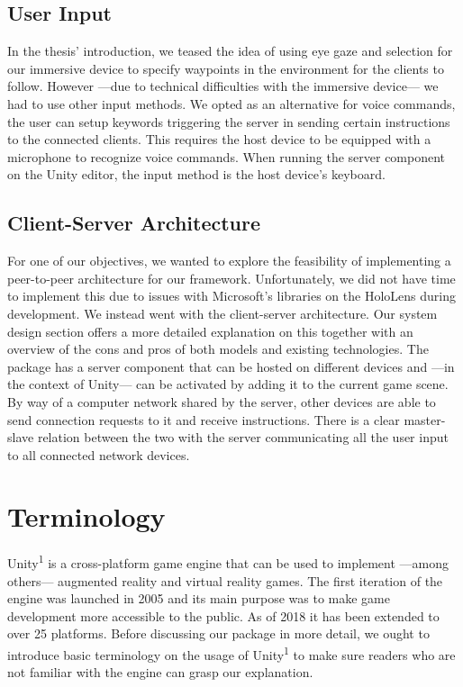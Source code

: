 \subsection{User Input}
In the thesis' introduction, we teased the idea of using eye gaze and selection for our immersive device to specify waypoints in the environment for the clients to follow. However ---due to technical difficulties with the immersive device--- we had to use other input methods. We opted as an alternative for voice commands, the user can setup keywords triggering the server in sending certain instructions to the connected clients. This requires the host device to be equipped with a microphone to recognize voice commands. When running the server component on the Unity editor, the input method is the host device's keyboard.

\subsection{Client-Server Architecture}
For one of our objectives, we wanted to explore the feasibility of implementing a peer-to-peer architecture for our framework. Unfortunately, we did not have time to implement this due to issues with Microsoft's libraries on the HoloLens during development. We instead went with the client-server architecture. Our system design section offers a more detailed explanation on this together with an overview of the cons and pros of both models and existing technologies. The package has a server component that can be hosted on different devices and ---in the context of Unity--- can be activated by adding it to the current game scene. By way of a computer network shared by the server, other devices are able to send connection requests to it and receive instructions. There is a clear master-slave relation between the two with the server communicating all the user input to all connected network devices.

\section{Terminology}
Unity\textsuperscript{1} is a cross-platform game engine that can be used to implement ---among others--- augmented reality and virtual reality games. The first iteration of the engine was launched in 2005 and its main purpose was to make game development more accessible to the public. As of 2018 it has been extended to over 25 platforms. Before discussing our package in more detail, we ought to introduce basic terminology on the usage of Unity\textsuperscript{1} to make sure readers who are not familiar with the engine can grasp our explanation.

